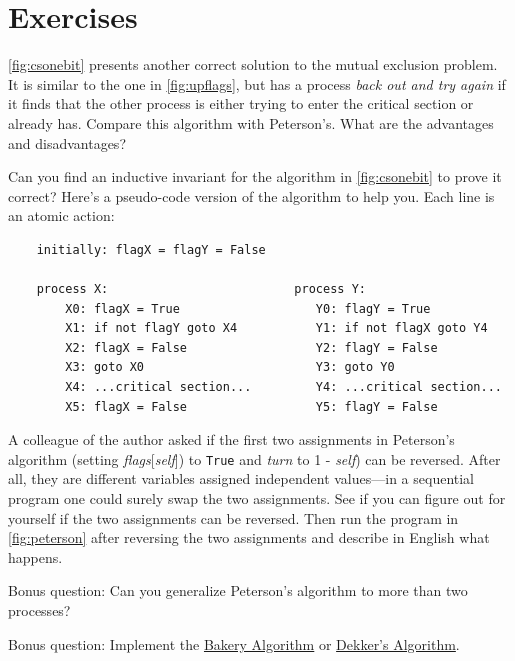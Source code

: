 \documentclass{report}
\newenvironment{code}{
\tcolorbox
}{
\endtcolorbox
}
\begin{document}
\section*{Exercises}
\begin{problems}
\item \autoref{fig:csonebit} presents another correct solution to the
mutual exclusion problem.  It is similar to the one in
\autoref{fig:upflags}, but has a process \emph{back out and try again}
if it finds that the other process is either trying to enter the critical
section or already has.  Compare this algorithm with Peterson's.  What are
the advantages and disadvantages?
\item
Can you find an inductive invariant for the algorithm in
\autoref{fig:csonebit} to prove it correct?
Here's a pseudo-code version of the algorithm to help you.  Each line
is an atomic action:
\begin{code}
\begin{verbatim}
    initially: flagX = flagY = False

    process X:                          process Y:
        X0: flagX = True                   Y0: flagY = True
        X1: if not flagY goto X4           Y1: if not flagX goto Y4
        X2: flagX = False                  Y2: flagY = False
        X3: goto X0                        Y3: goto Y0
        X4: ...critical section...         Y4: ...critical section...
        X5: flagX = False                  Y5: flagY = False
\end{verbatim}
\end{code}
\item A colleague of the author asked if the first two assignments in
Peterson's algorithm (setting \textit{flags}[\textit{self}])
to \texttt{True} and \textit{turn} to 1 - \textit{self}) can be reversed.
After all, they are different variables assigned independent values---in a
sequential program one could surely swap the two assignments.
See if you can figure out for yourself if the two assignments can be
reversed.  Then run the program in \autoref{fig:peterson} after reversing
the two assignments and describe in English what happens.
\item Bonus question:
Can you generalize Peterson's algorithm to more than two processes?
\item Bonus question:
Implement the
\href{https://en.wikipedia.org/wiki/Lamport%27s_bakery_algorithm}{Bakery Algorithm}
or \href{https://en.wikipedia.org/wiki/Dekker%27s_algorithm}{Dekker's Algorithm}.
\end{problems}
\end{document}
